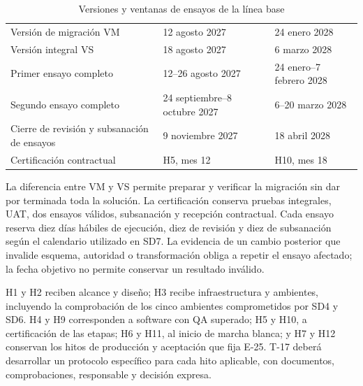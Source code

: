 \begin{table}[htbp]
\centering
\caption{Versiones y ventanas de ensayos de la línea base}
\label{tab:sd9-versiones}
\small
\begin{tabularx}{\textwidth}{L{.30\textwidth}Y Y}
\hline
{} &  &  \\\hline
Versión de migración VM & 12 agosto 2027 & 24 enero 2028 \\\hline
Versión integral VS & 18 agosto 2027 & 6 marzo 2028 \\\hline
Primer ensayo completo & 12--26 agosto 2027 & 24 enero--7 febrero 2028 \\\hline
Segundo ensayo completo & 24 septiembre--8 octubre 2027 & 6--20 marzo 2028 \\\hline
Cierre de revisión y subsanación de ensayos & 9 noviembre 2027 & 18 abril 2028 \\\hline
Certificación contractual & H5, mes 12 & H10, mes 18 \\\hline
\end{tabularx}
\end{table}

La diferencia entre VM y VS permite preparar y verificar la migración sin dar por terminada toda la solución. La certificación conserva pruebas integrales, UAT, dos ensayos válidos, subsanación y recepción contractual. Cada ensayo reserva diez días hábiles de ejecución, diez de revisión y diez de subsanación según el calendario utilizado en SD7. La evidencia de un cambio posterior que invalide esquema, autoridad o transformación obliga a repetir el ensayo afectado; la fecha objetivo no permite conservar un resultado inválido. \parencite[Ensayos completos y recepción previa a los cortes]{sd9-t14}

H1 y H2 reciben alcance y diseño; H3 recibe infraestructura y ambientes, incluyendo la comprobación de los cinco ambientes comprometidos por SD4 y SD6. H4 y H9 corresponden a software con QA superado; H5 y H10, a certificación de las etapas; H6 y H11, al inicio de marcha blanca; y H7 y H12 conservan los hitos de producción y aceptación que fija E-25. T-17 deberá desarrollar un protocolo específico para cada hito aplicable, con documentos, comprobaciones, responsable y decisión expresa. \parencites[Formulario E-25, p.~74]{sd9-ba}[sec.~6.2, DevSecOps, ambientes y cadena de suministro]{sd9-sd6}

